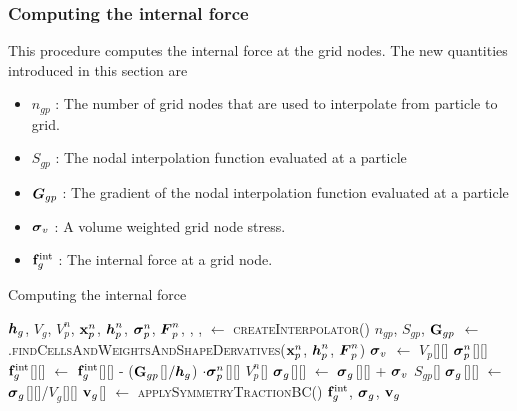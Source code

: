 \subsubsection{Computing the internal force}
This procedure computes the internal force at the grid nodes. The new quantities introduced in this 
section are
\begin{itemize} 
  \setlength\itemsep{1pt}
  \item $n_{gp}$ : {\Ochre The number of grid nodes that are used to interpolate from particle to grid.}
  \item $S_{gp}$ : {\Ochre The nodal interpolation function evaluated at a particle}
  \item $\boldsymbol{G}_{gp}$ : {\Ochre The gradient of the nodal interpolation function evaluated at a particle}
  \item $\boldsymbol{\sigma}_v$ : {\Ochre A volume weighted grid node stress.}
  \item $\mathbf{f}^{\text{int}}_g$ : {\Ochre The internal force at a grid node.}
\end{itemize}
\begin{breakablealgorithm}
  \caption{Computing the internal force}
  \begin{algorithmic}[1]
    \Require $\boldsymbol{h}_g$, $V_g$, $V_p^n$, $\mathbf{x}_p^n$, $\boldsymbol{h}_p^n$, $\boldsymbol{\sigma}_p^n$, $\boldsymbol{F}_p^n$,
             , , 
      \State {} $\leftarrow$ \textsc{createInterpolator}()
          \State $n_{gp}$, $S_{gp}$, $\mathbf{G}_{gp}$ $\leftarrow$   \WWRP
            .\textsc{findCellsAndWeightsAndShapeDervatives}($\mathbf{x}_p^n$, $\boldsymbol{h}_p^n$, $\boldsymbol{F}_p^n$) \WWRP
          \State $\boldsymbol{\sigma}_v$ $\leftarrow$ $V_p$[\TTmatl][\TTpart] $\boldsymbol{\sigma}_p^n$[\TTmatl][\TTpart] 
            \State $\mathbf{f}^{\text{int}}_g$[\TTmatl][\TTnode] $\leftarrow$ $\mathbf{f}^{\text{int}}_g$[\TTmatl][\TTnode] - 
               ($\mathbf{G}_{gp}$[\TTnode]$/\boldsymbol{h}_g$) $\cdot \boldsymbol{\sigma}_p^n$[\TTmatl][\TTpart] $V_p^n$[\TTpart]
            \State $\boldsymbol{\sigma}_g$[\TTmatl][\TTnode] $\leftarrow$ $\boldsymbol{\sigma}_g$[\TTmatl][\TTnode] + $\boldsymbol{\sigma}_v$ $S_{gp}$[\TTnode]
          \EndFor
        \EndFor
          \State $\boldsymbol{\sigma}_g$[\TTmatl][\TTnode] $\leftarrow$ $\boldsymbol{\sigma}_g$[\TTmatl][\TTnode]/$V_g$[\TTmatl][\TTnode]
        \EndFor
        \State $\mathbf{v}_g$[\TTmatl] $\leftarrow$ \textsc{applySymmetryTractionBC}()
      \EndFor
      \State \Return $\mathbf{f}_g^{\text{int}}$, $\boldsymbol{\sigma}_g$, $\mathbf{v}_g$
    \EndProcedure
  \end{algorithmic}
\end{breakablealgorithm}

